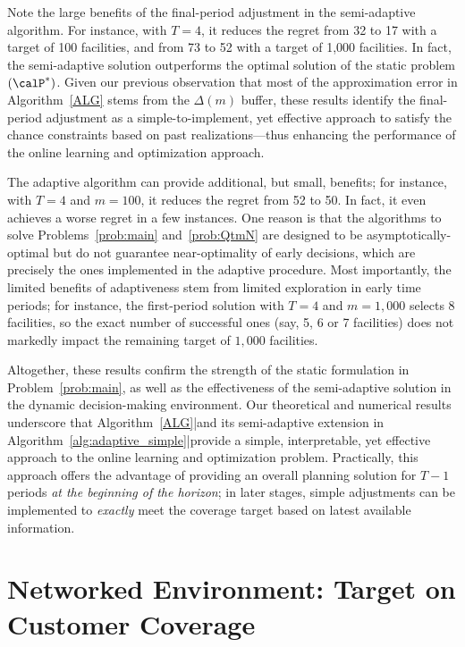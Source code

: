 \documentclass[blindrev]{informs3noheader}
\begin{document}
Note the large benefits of the final-period adjustment in the semi-adaptive algorithm. For instance, with $T=4$, it reduces the regret from 32 to 17 with a target of 100 facilities, and from 73 to 52 with a target of 1,000 facilities. In fact, the semi-adaptive solution outperforms the optimal solution of the static problem $(\calP^*)$. Given our previous observation that most of the approximation error in Algorithm~\ref{ALG} stems from the $\Delta(m)$ buffer, these results identify the final-period adjustment as a simple-to-implement, yet effective approach to satisfy the chance constraints based on past realizations---thus enhancing the performance of the online learning and optimization approach.

The adaptive algorithm can provide additional, but small, benefits; for instance, with $T=4$ and $m=100$, it reduces the regret from 52 to 50. In fact, it even achieves a worse regret in a few instances. One reason is that the algorithms to solve Problems~\eqref{prob:main} and~\ref{prob:QtmN} are designed to be asymptotically-optimal but do not guarantee near-optimality of early decisions, which are precisely the ones implemented in the adaptive procedure. Most importantly, the limited benefits of adaptiveness stem from limited exploration in early time periods; for instance, the first-period solution with $T=4$ and $m=1,000$ selects 8 facilities, so the exact number of successful ones (say, 5, 6 or 7 facilities) does not markedly impact the remaining target of $1,000$ facilities.

Altogether, these results confirm the strength of the static formulation in Problem~\eqref{prob:main}, as well as the effectiveness of the semi-adaptive solution in the dynamic decision-making environment. Our theoretical and numerical results underscore that Algorithm~\ref{ALG}|and its semi-adaptive extension in Algorithm~\ref{alg:adaptive_simple}|provide a simple, interpretable, yet effective approach to the online learning and optimization problem. Practically, this approach offers the advantage of providing an overall planning solution for $T-1$ periods \textit{at the beginning of the horizon}; in later stages, simple adjustments can be implemented to \textit{exactly} meet the coverage target based on latest available information.

\section{Networked Environment: Target on Customer Coverage}
\label{sec:network}
\end{document}
